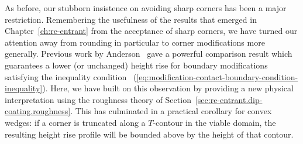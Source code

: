 As before,
our stubborn insistence on avoiding sharp corners
has been a major restriction.
Remembering the usefulness of the results that emerged
in Chapter~\ref{ch:re-entrant}
from the acceptance of sharp corners,
we have turned our attention away from rounding in particular
to corner modifications more generally.
Previous work
by Anderson~\cite[Section~7.3.2]{anderson-2002-thesis-boundary-tracing-pdes}
gave a powerful comparison result
which guarantees a lower (or unchanged) height rise
for boundary modifications satisfying the inequality condition~%
  (\ref{eq:modification-contact-boundary-condition-inequality}).
Here, we have built on this observation
by providing a new physical interpretation
using the roughness theory
of Section~\ref{sec:re-entrant.dip-coating.roughness}.
This has culminated in a practical corollary for convex wedges:
if a corner is truncated along a $T$-contour in the viable domain,
the resulting height rise profile will be bounded above
by the height of that contour.
